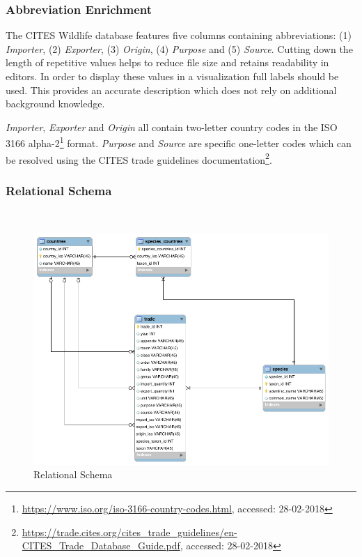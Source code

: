 \subsubsection{Abbreviation Enrichment}
The CITES Wildlife database features five columns containing abbreviations: (1) \textit{Importer}, (2) \textit{Exporter}, (3) \textit{Origin}, (4) \textit{Purpose} and (5) \textit{Source}.
Cutting down the length of repetitive values helps to reduce file size and retains readability in editors.
In order to display these values in a visualization full labels should be used.
This provides an accurate description which does not rely on additional background knowledge.

\textit{Importer}, \textit{Exporter} and \textit{Origin} all contain two-letter country codes in the ISO 3166 alpha-2\footnote{\url{https://www.iso.org/iso-3166-country-codes.html}, accessed: 28-02-2018} format.
\textit{Purpose} and \textit{Source} are specific one-letter codes which can be resolved using the CITES trade guidelines documentation\footnote{\url{https://trade.cites.org/cites_trade_guidelines/en-CITES_Trade_Database_Guide.pdf}, accessed: 28-02-2018}.


\subsubsection{Relational Schema} 
\textcolor{white}{filler}

\begin{figure} [h] 
\includegraphics[width=12cm]{images/relation_schema.png}
\caption{Relational Schema}
\label{Relation Schema}
\end{figure}
